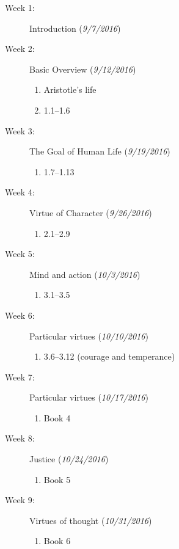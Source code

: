 \documentclass[article,oneside]{memoir}
\begin{document}
\begin{description}

\item[Week 1:] Introduction  (\emph{9/7/2016})

\item[Week 2:]  Basic Overview  (\emph{9/12/2016})
\begin{enumerate}
\item Aristotle's life
\item 1.1--1.6
\end{enumerate}

\item[Week 3:]  The Goal of Human Life (\emph{9/19/2016})
\begin{enumerate}
\item 1.7--1.13
\end{enumerate}

\item[Week 4: ] Virtue of Character (\emph{9/26/2016})
\begin{enumerate}
\item 2.1--2.9
\end{enumerate}


\item[Week 5: ] Mind and action (\emph{10/3/2016})
\begin{enumerate}
\item 3.1--3.5
 \end{enumerate}
 
\item[Week 6:] Particular virtues (\emph{10/10/2016})
\begin{enumerate}
\item 3.6--3.12 (courage and temperance)
\end{enumerate}

\item[Week 7:] Particular virtues (\emph{10/17/2016})
\begin{enumerate}
\item Book 4
\end{enumerate}


\item[Week 8:] Justice  (\emph{10/24/2016})
\begin{enumerate}
\item Book 5
\end{enumerate}


\item[Week 9:] Virtues of thought (\emph{10/31/2016})
\begin{enumerate}
\item Book 6
\end{enumerate}


\end{description}
\end{document}
